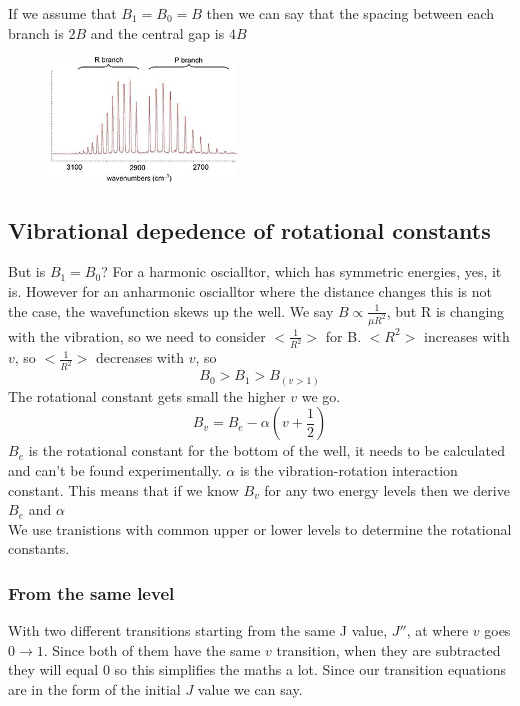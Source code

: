 \documentclass{article}
\begin{document}
    If we assume that $B_1 = B_0 = B$ then we can say that the spacing between each branch is $2B$ and the central
    gap is $4B$
    \begin{figure}[h]
        \centering
        \includegraphics[width=5cm]{rbr.jpg}
    \end{figure}

    \newpage
    \subsection{Vibrational depedence of rotational constants}
    
    But is $B_1 = B_0$? For a harmonic oscialltor, which has symmetric energies, yes, it is. However for an
    anharmonic oscialltor where the distance changes this is not the case, the wavefunction skews up the well.
    We say $B \propto \frac{1}{\mu R^2}$, but R is changing with the vibration, so we need to consider
    $<\frac{1}{R^2}>$ for B. $<R^2>$ increases with $v$, so $<\frac{1}{R^2}>$ decreases with $v$, so
    $$B_0 > B_1 > B_{(v>1)}$$
    The rotational constant gets small the higher $v$ we go.
    $$B_v = B_e - \alpha\left(v + \frac{1}{2}\right)$$
    $B_e$ is the rotational constant for the bottom of the well, it needs to be calculated and can't be found experimentally.
    $\alpha$ is the vibration-rotation interaction constant. 
    This means that if we know $B_v$ for any two energy levels then we derive $B_e$ and $\alpha$\\

    We use tranistions with common upper or lower levels to determine the rotational constants.
    \subsubsection{From the same level}
    With two different transitions starting from the same J value, $J''$, at where $v$ goes $0\rightarrow1$.
    Since both of them have the same $v$ transition, when they are subtracted they will equal 0 so this simplifies
    the maths a lot. Since our transition equations are in the form of the initial $J$ value we can say.
    
\end{document}
